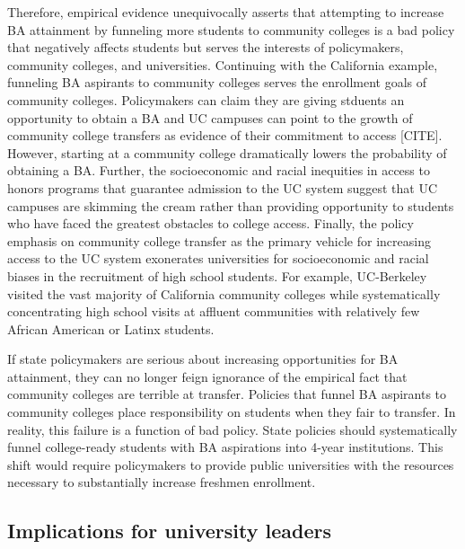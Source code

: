 \documentclass[twoside]{article}
\begin{document}
Therefore, empirical evidence unequivocally asserts that attempting to increase BA attainment by funneling more students to community colleges is a bad policy that negatively affects students but serves the interests of policymakers, community colleges, and universities.  Continuing with the California example, funneling BA aspirants to community colleges serves the enrollment goals of community colleges. Policymakers can claim they are giving stduents an opportunity to obtain a BA and UC campuses can point to the growth of community college transfers as evidence of their commitment to access [CITE].  However, starting at a community college dramatically lowers the probability of obtaining a BA.  Further, the socioeconomic and racial inequities in access to honors programs that guarantee admission to the UC system suggest that UC campuses are skimming the cream rather than providing opportunity to students who have faced the greatest obstacles to college access. Finally, the policy emphasis on community college transfer as the primary vehicle for increasing access to the UC system exonerates universities for socioeconomic and racial biases in the recruitment of high school students.  For example, UC-Berkeley visited the vast majority of California community colleges while systematically concentrating high school visits at affluent communities with relatively few African American or Latinx students.

If state policymakers are serious about increasing opportunities for BA attainment, they can no longer feign ignorance of the empirical fact that community colleges are terrible at transfer.  Policies that funnel BA aspirants to community colleges place responsibility on students when they fair to transfer. In reality, this failure is a function of bad policy. State policies should systematically funnel college-ready students with BA aspirations into 4-year institutions.  This shift would require policymakers to provide public universities with the resources necessary to substantially increase freshmen enrollment.

\subsection*{Implications for university leaders}
\end{document}
